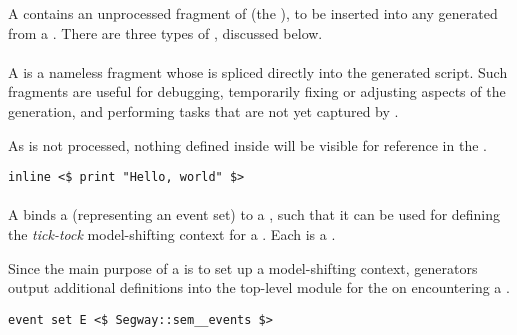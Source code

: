 A \mcspfragment{} contains an unprocessed fragment of \cspm{} (the
), to be inserted
into any \cspm{} generated from a \mrapackage.
There are three types of \mcspfragment, discussed below.

\paragraph{\minlinecspfragment}

A \minlinecspfragment{} is a nameless fragment whose  is
spliced directly into the generated \cspm{} script.  Such fragments are useful
for debugging, temporarily fixing or adjusting aspects of the \cspm{}
generation, and performing tasks that are not yet captured by \langname.

\begin{remark}
As  is not processed, nothing defined inside will be
visible for reference in the \mrapackage.
\end{remark}

\begin{lstlisting}[style=Example]
inline <$ print "Hello, world" $>
\end{lstlisting}

\paragraph{\meventsetcspfragment}


A \meventsetcspfragment{} binds a
 (representing an event set) to a
, such that it can be used for defining
the \emph{tick-tock} model-shifting context for a
\mprocesscspfragment.  Each \meventsetcspfragment{} is a \mcspcontextsource.

\begin{remark}
Since the main purpose of a \meventsetcspfragment{} is to set up a
model-shifting context, generators \rfcmay{} output additional definitions into
the top-level module for the \mrapackage{} on encountering a
\meventsetcspfragment.
\end{remark}

\begin{lstlisting}[style=Example]
event set E <$ Segway::sem__events $>
\end{lstlisting}


